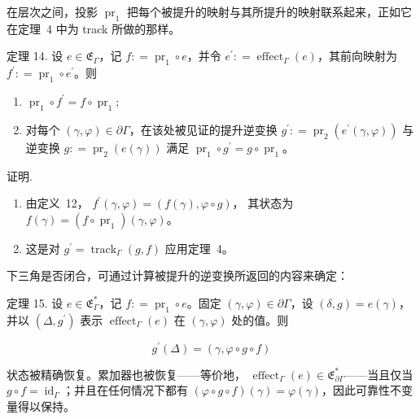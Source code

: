 在层次之间，投影 \(\operatorname { p r } _ { 1 }\) 把每个被提升的映射与其所提升的映射联系起来，正如它在定理~4 中为 track 所做的那样。

定理 14. 设 \(e \in \mathfrak { E } _ { \Gamma }\)，记 \(f : = \operatorname { p r } _ { 1 } \circ e\)，并令
\(e ^ { \prime } : = \operatorname { e f f e c t } _ { \Gamma } ( e )\)，其前向映射为
\(f ^ { \prime } : = \operatorname { p r } _ { 1 } \circ e ^ { \prime }\)。则

\begin{enumerate}
\def\labelenumi{\arabic{enumi}.}
\item
  \(\operatorname { p r } _ { 1 } \circ f ^ { \prime } = f \circ \operatorname { p r } _ { 1 } ;\)
\item
  对每个 \(( \gamma , \varphi ) \in \partial \Gamma\)，在该处被见证的提升逆变换
  \(g ^ { \prime } : = \operatorname { p r } _ { 2 } ( e ^ { \prime } ( \gamma , \varphi ) )\) 与逆变换
  \(g : = \operatorname { p r } _ { 2 } ( e ( \gamma ) )\) 满足
  \(\operatorname { p r } _ { 1 } \circ g ^ { \prime } = g \circ \operatorname { p r } _ { 1 }\)。
\end{enumerate}

证明.

\begin{enumerate}
\def\labelenumi{\arabic{enumi}.}
\item
  由定义~12，
  \(f ^ { \prime } ( \gamma , \varphi ) = ( f ( \gamma ) , \varphi \circ g )\)，
  其状态为
  \(f ( \gamma ) = ( f \circ \operatorname { p r } _ { 1 } ) ( \gamma , \varphi )\)。
\item
  这是对 \(g ^ { \prime } = \operatorname { t r a c k } _ { \Gamma } ( g , f )\) 应用定理~4。
\end{enumerate}

下三角是否闭合，可通过计算被提升的逆变换所返回的内容来确定：

定理 15. 设 \(e \in \mathfrak { E } _ { \Gamma } ^ { * }\)，记 \(f : = \operatorname { p r } _ { 1 } \circ e\)。固定
\(( \gamma , \varphi ) \in \partial \Gamma\)，设 \(( \delta , g ) = e ( \gamma )\)，并以
\(( \Delta , g ^ { \prime } )\) 表示 \(\operatorname { e f f e c t } _ { \Gamma } ( e )\) 在
\(( \gamma , \varphi )\) 处的值。则

\[
g ^ { \prime } ( \Delta ) = ( \gamma , \varphi \circ g \circ f )\tag{16}
\]

状态被精确恢复。累加器也被恢复——等价地，
\(\operatorname { e f f e c t } _ { \Gamma } ( e ) \in \mathfrak { E } _ { \partial \Gamma } ^ { * }\)——当且仅当
\(g \circ f = \operatorname { i d } _ { \Gamma }\)；并且在任何情况下都有
\(( \varphi \circ g \circ f ) ( \gamma ) = \varphi ( \gamma )\)，因此可靠性不变量得以保持。

